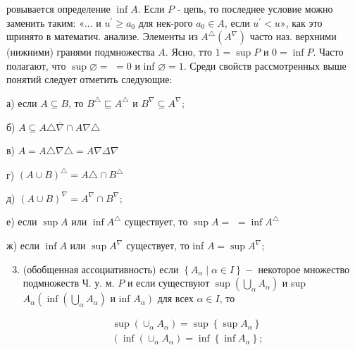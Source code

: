 \documentclass[10pt]{article}
\begin{document}
ровывается определение $\inf A$. Если $P$ - цепь, то последнее условие можно заменить таким: «... и $u^{\prime} \geqslant a_{0}$ для нек-рого $a_{0} \in A$, если $u^{\prime}<u »$, как это шринято в математич. анализе. Элементы из $A^{\triangle}\left(A^{\nabla}\right)$ часто наз. верхними (нижними) гранями подмножества $A$. Ясно, тто $1=\sup P$ и $0=\inf P$. Часто полагают, что $\sup \varnothing=$ $=0$ и inf $\varnothing=1$. Среди свойств рассмотренных выше понятий следует отметить следующие:



а) если $A \subseteq B$, то $B^{\triangle} \sqsubseteq A^{\triangle}$ и $B^{\nabla} \subseteq A^{\nabla}$;



б) $A \subseteq A \triangle \bar{\nabla} \cap A \nabla \triangle$



в) $A=A \triangle \nabla \triangle=A \nabla \Delta \nabla$



г) $(A \cup B)^{\triangle}=A \triangle \cap B^{\triangle}$



д) $(A \cup B)^{\nabla}=A^{\nabla} \cap B^{\nabla}$;



е) если $\sup A$ или $\inf A^{\triangle}$ существует, то $\sup A=$ $=\inf A^{\triangle}$



ж) если $\inf A$ или $\sup A^{\nabla}$ существует, то inf $A=\sup A^{\nabla}$;



\begin{enumerate}

  \setcounter{enumi}{2}

  \item (обобщенная ассоциативность) если $\left\{A_{\alpha} \mid \alpha \in I\right\}-$ некоторое множество подмножеств Ч. у. м. $P$ и если существуют $\sup \left(\bigcup_{\alpha} A_{\alpha}\right)$ и sup $A_{\alpha}\left(\inf \left(\bigcup_{\alpha} A_{\alpha}\right)\right.$ и inf $\left.A_{\alpha}\right)$ для всех $\alpha \in I$, то

\end{enumerate}



\[

\begin{aligned}

& \sup \left(\cup_{\alpha} A_{\alpha}\right)=\sup \left\{\sup A_{\alpha}\right\} \\

& \left(\inf \left(\cup_{\alpha} A_{\alpha}\right)=\inf \left\{\inf A_{\alpha}\right\} ;\right.

\end{aligned}

\]
\end{document}
